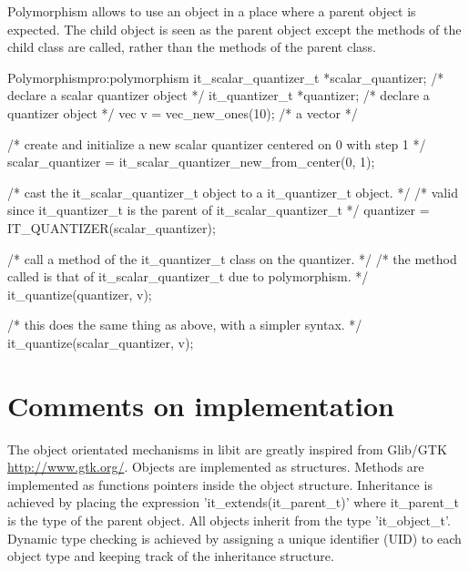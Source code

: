   Polymorphism allows to use an object in a place where a parent
  object is expected. The child object is seen as the parent object
  except the methods of the child class are called, rather than the
  methods of the parent class.  

\begin{program}{Polymorphism}{pro:polymorphism}
it_scalar_quantizer_t *scalar_quantizer; /* declare a scalar quantizer object */
it_quantizer_t *quantizer; /* declare a quantizer object */
vec v = vec_new_ones(10);  /* a vector */

/* create and initialize a new scalar quantizer centered on 0 with step 1 */
scalar_quantizer = it_scalar_quantizer_new_from_center(0, 1);

/* cast the it_scalar_quantizer_t object to a it_quantizer_t object. */
/* valid since it_quantizer_t is the parent of it_scalar_quantizer_t */
quantizer = IT_QUANTIZER(scalar_quantizer);

/* call a method of the it_quantizer_t class on the quantizer. */
/* the method called is that of it_scalar_quantizer_t due to polymorphism. */
it_quantize(quantizer, v);

/* this does the same thing as above, with a simpler syntax. */
it_quantize(scalar_quantizer, v);
\end{program}

\section{Comments on implementation}
\label{sec:comments}

     The object orientated mechanisms in libit are greatly inspired
  from Glib/GTK \url{http://www.gtk.org/}. Objects are
  implemented as structures. Methods are implemented as functions
  pointers inside the object structure. Inheritance is achieved by
  placing the expression 'it\_extends(it\_parent\_t)' where it\_parent\_t
  is the type of the parent object. All objects inherit from the type
  'it\_object\_t'. Dynamic type checking is achieved by assigning a
  unique identifier (UID) to each object type and keeping track of the
  inheritance structure. 
